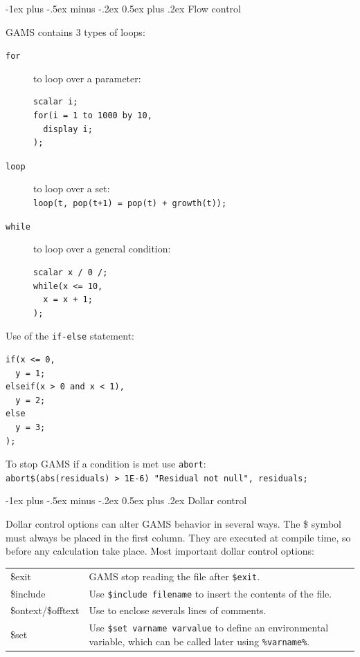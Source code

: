 \documentclass[10pt,landscape,a4paper]{article}
\makeatletter
\renewcommand{\section}{\@startsection{section}{1}{0mm}%
                                {-1ex plus -.5ex minus -.2ex}%
                                {0.5ex plus .2ex}%
                                {\color{blue}\normalfont\large\bfseries}}
\makeatother
\begin{document}
\begin{multicols}{2}
\section{Flow control}

GAMS contains 3 types of loops:
\begin{description}
\item[\texttt{for}] to loop over a parameter:\\
\begin{verbatim}
scalar i;
for(i = 1 to 1000 by 10,
  display i;
);
\end{verbatim}
\item[\texttt{loop}] to loop over a set:\\
  \verb!loop(t, pop(t+1) = pop(t) + growth(t));!
\item[\texttt{while}] to loop over a general condition:\\
\begin{verbatim}
scalar x / 0 /;
while(x <= 10,
  x = x + 1;
);
\end{verbatim}
\end{description}

Use of the \verb!if-else! statement:\\
\begin{verbatim}
if(x <= 0,
  y = 1;
elseif(x > 0 and x < 1),
  y = 2;
else
  y = 3;
);
\end{verbatim}

To stop GAMS if a condition is met use \verb!abort!:\\
\verb!abort$(abs(residuals) > 1E-6) "Residual not null", residuals;!

\section{Dollar control}

Dollar control options can alter GAMS behavior in several ways. The \$ symbol
must always be placed in the first column. They are executed at compile time, so
before any calculation take place. Most important dollar control options:
\begin{tabularx}{\columnwidth}{@{}>{\ttfamily}lX@{}}
\$exit & GAMS stop reading the file after \texttt{\$exit}.\\
\$include & Use \texttt{\$include filename} to insert the contents of the
file.\\
\$ontext\textrm{/}\$offtext & Use to enclose severals lines of comments.\\
\$set & Use \texttt{\$set varname varvalue} to define an environmental
variable, which can be called later using \texttt{\%varname\%}.
\end{tabularx}


\end{multicols}
\end{document}
